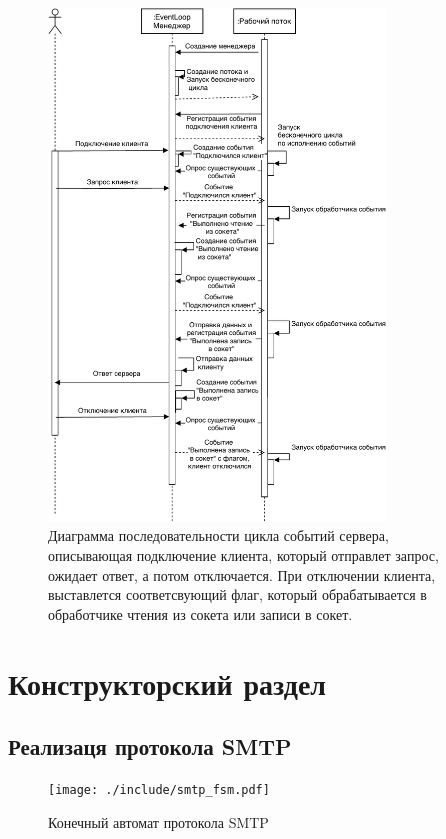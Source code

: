 \documentclass[a4paper,12pt]{report}
\begin{document}
	\begin{figure}[H]
		\centering
		\includegraphics[width=0.8\textwidth]{./resource/SequenceDiagram_EventLoop.pdf}
		\caption{ Диаграмма последовательности цикла событий сервера, описывающая подключение клиента, который отправлет запрос, ожидает ответ, а потом отключается. При отключении клиента, выставлется соответсвующий флаг, который обрабатывается в обработчике чтения из сокета или записи в сокет.} \label{fig:EventLoopSequence}
	\end{figure}


 \chapter{Конструкторский раздел}

 \section{Реализаця протокола SMTP}
    
    \begin{figure}[h]
	\centering
	\texttt{[image: ./include/smtp\_fsm.pdf]}
	\caption{Конечный автомат протокола SMTP}
	\label{fig:smtp_fsm}
\end{figure}
\end{document}
